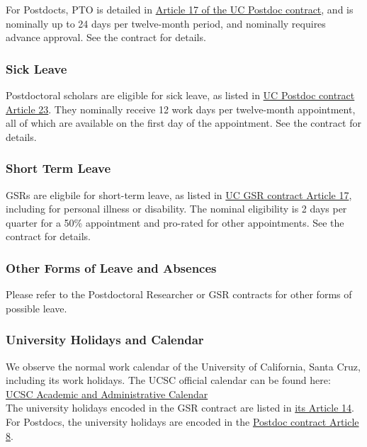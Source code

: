 \noindent
For Postdocts, PTO is detailed in \href{https://ucnet.universityofcalifornia.edu/wp-content/uploads/labor/bargaining-units/px/docs/px_tentative_agremeents_effective_12-09-2022.pdf}{Article 17 of the UC Postdoc contract}, and is nominally up to 24 days per twelve-month period, and nominally requires advance approval. See the contract for details.


\subsubsection{Sick Leave}

Postdoctoral scholars are eligible for sick leave, as listed in \href{https://ucnet.universityofcalifornia.edu/wp-content/uploads/labor/bargaining-units/px/docs/px_tentative_agremeents_effective_12-09-2022.pdf}{UC Postdoc contract Article 23}. They nominally receive 12 work days per twelve-month appointment, all of which are available on the first day of the appointment.  See the contract for details.

\subsubsection{Short Term Leave}

GSRs are eligbile for short-term leave, as listed in \href{https://ucnet.universityofcalifornia.edu/wp-content/uploads/labor/bargaining-units/br/docs/br_17_leaves_2022-2025.pdf}{UC GSR contract Article 17}, including for personal illness or disability. The nominal eligibility is 2 days per quarter for a 50\% appointment and pro-rated for other appointments. See the contract for details.


\subsubsection{Other Forms of Leave and Absences}

Please refer to the Postdoctoral Researcher or GSR contracts for other forms of possible leave. 

\subsubsection{University Holidays and Calendar}

We observe the normal work calendar of the University of California, Santa Cruz, including its work holidays.
The UCSC official calendar can be found here:\\

\noindent
\href{https://registrar.ucsc.edu/calendar/academiccalendar.html}{UCSC Academic and Administrative Calendar}\\

\noindent
The university holidays encoded in the GSR contract are listed in \href{https://qa.ucnet.universityofcalifornia.edu/labor/bargaining-units/br/docs/br_14_holidays_2022-2025.pdf}{its Article 14}. For Postdocs, the university holidays are encoded in the \href{https://ucnet.universityofcalifornia.edu/wp-content/uploads/labor/bargaining-units/px/docs/px_tentative_agremeents_effective_12-09-2022.pdf}{Postdoc contract Article 8}.

